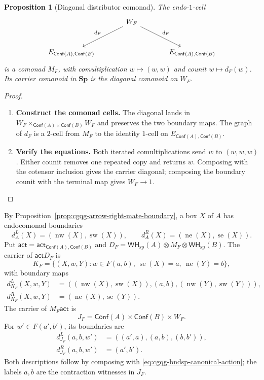 \documentclass[oneside]{article}
\newcommand{\Conf}{\mathsf{Conf}}
\newcommand{\WH}{\mathsf{WH}}
\newcommand{\Sp}{\mathbf{Sp}}
\newcommand{\act}{\mathsf{act}}
\newcommand{\boxnw}[1]{\operatorname{nw}(#1)}
\newcommand{\boxne}[1]{\operatorname{ne}(#1)}
\newcommand{\boxsw}[1]{\operatorname{sw}(#1)}
\newcommand{\boxse}[1]{\operatorname{se}(#1)}
\theoremstyle{plain}
\newtheorem{proposition}[theorem]{Proposition}
\theoremstyle{definition}
\theoremstyle{remark}
\begin{document}
\begin{proposition}[Diagonal distributor comonad]
\label{prop:cgqg-diagonal-distributor-comonad}
The endo-\(1\)-cell
\[
 \begin{tikzcd}[column sep=large,row sep=large]
 &W_F\arrow[dl,"d_F"']\arrow[dr,"d_F"]&\\
 E_{\Conf(A),\Conf(B)}&&E_{\Conf(A),\Conf(B)}
 \end{tikzcd}
\]
is a comonad \(M_F\), with comultiplication \(w\mapsto(w,w)\) and
counit \(w\mapsto d_F(w)\). Its carrier comonoid in \(\Sp\) is the
diagonal comonoid on \(W_F\).
\end{proposition}
\begin{proof}
    \leavevmode
    \begin{enumerate}[beginpenalty=10000]
        \item \textbf{Construct the comonad cells.}
        The diagonal lands in \(W_F\times_{\Conf(A)\times \Conf(B)}W_F\) and
        preserves the two boundary maps. The graph of \(d_F\) is a
        \(2\)-cell from \(M_F\) to the identity \(1\)-cell on \(E_{\Conf(A),\Conf(B)}\).

        \item \textbf{Verify the equations.}
        Both iterated comultiplications send \(w\) to \((w,w,w)\).
        Either counit removes one repeated copy and returns \(w\).
        Composing with the cotensor inclusion gives the carrier diagonal;
        composing the boundary counit with the terminal map gives
        \(W_F\to1\). \qedhere
    \end{enumerate}
\end{proof}

By Proposition~\ref{prop:cgqg-arrow-right-mate-boundary}, a box \(X\) of
\(A\) has endocomonad boundaries
\[
 d_A^{L}(X)=(\boxnw{X},\boxsw{X}),\qquad d_A^{R}(X)=(\boxne{X},\boxse{X}).
\]
Put \(\act=\act_{\Conf(A),\Conf(B)}\) and \(D_F=\WH_{\mathrm{sp}}(A)\otimes M_F\otimes \WH_{\mathrm{sp}}(B)\).
The carrier of \(\act D_F\) is
\begin{equation}
 K_F=\{(X,w,Y):w\in F(a,b),\ \boxse{X}=a,\ \boxne{Y}=b\},
 \label{eq:cgqg-qmodule-action-source}
\end{equation}
with boundary maps
\begin{equation}
 \begin{split}
 d^{L}_{K_F}(X,w,Y)&=((\boxnw{X},\boxsw{X}),(a,b),(\boxnw{Y},\boxsw{Y})),\\
 d^{R}_{K_F}(X,w,Y)&=(\boxne{X},\boxse{Y}).
 \end{split}
 \label{eq:cgqg-qmodule-action-source-boundaries}
\end{equation}
The carrier of \(M_F\act\) is
\[
 J_F=\Conf(A)\times \Conf(B)\times W_F.
\]
For \(w'\in F(a',b')\), its boundaries are
\begin{equation}
 \begin{split}
 d^{L}_{J_F}(a,b,w')&=((a',a),(a,b),(b,b')),\\
 d^{R}_{J_F}(a,b,w')&=(a',b').
 \end{split}
 \label{eq:cgqg-qmodule-action-target-boundaries}
\end{equation}
Both descriptions follow by composing with
\eqref{eq:cgqg-bndsp-canonical-action}; the labels \(a,b\) are the
contraction witnesses in \(J_F\).
\end{document}
